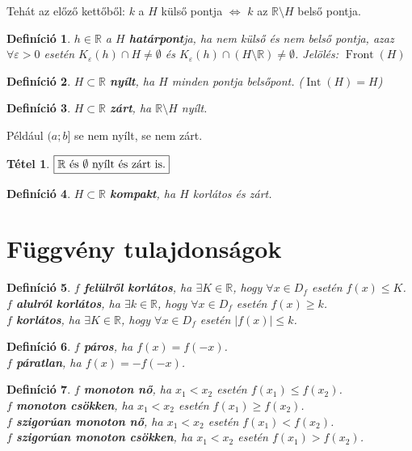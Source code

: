 \documentclass[a4paper,12pt,twoside]{book}
\DeclareMathOperator{\Int}{Int}
\DeclareMathOperator{\Front}{Front}
\newtheorem{tetel}{Tétel}[chapter]
\newtheorem{defi}{Definíció}[chapter]
\theoremstyle{break}
\newtheorem{defiNL}[defi]{Definíció}
\theoremstyle{plain}
\begin{document}
Tehát az előző kettőből: $k$ a $H$ külső pontja $\Leftrightarrow$ $k$ az $\mathbb{R}\setminus H$ belső pontja.

\begin{defi}
 $h\in \mathbb{R}$ a $H$ \textbf{határpont}ja, ha nem külső és nem belső pontja, azaz $\forall \varepsilon >0$ esetén $K_{\varepsilon}(h)\cap H\neq \emptyset$ és $K_{\varepsilon}(h)\cap (H\setminus \mathbb{R}) \neq \emptyset$. Jelölés: $\Front(H)$
\end{defi}

\begin{defi}
 $H\subset \mathbb{R}$ \textbf{nyílt}, ha $H$ minden pontja belsőpont. ($\Int(H)=H$)
\end{defi}

\begin{defi}
 $H\subset \mathbb{R}$ \textbf{zárt}, ha $\mathbb{R}\setminus H$ nyílt.
\end{defi}

Például $(a;b]$ se nem nyílt, se nem zárt.

\begin{tetel}
 $\boxed{\mathbb{R}$ és $\emptyset$ nyílt és zárt is.$}$
\end{tetel}
\addtocounter{biz}{1}

\begin{defi}
 $H\subset \mathbb{R}$ \textbf{kompakt}, ha $H$ korlátos és zárt.
\end{defi}

\section{Függvény tulajdonságok}

\begin{defiNL}
 $f$ \textbf{felülről korlátos}, ha $\exists K\in\mathbb{R}$, hogy $\forall x\in D_f$ esetén $f(x)\leqslant K$.\\
 $f$ \textbf{alulról korlátos}, ha $\exists k\in\mathbb{R}$, hogy $\forall x\in D_f$ esetén $f(x)\geqslant k$.\\
 $f$ \textbf{korlátos}, ha $\exists K\in\mathbb{R}$, hogy $\forall x\in D_f$ esetén $|f(x)|\leqslant k$.
\end{defiNL}

\begin{defiNL}
 $f$ \textbf{páros}, ha $f(x)=f(-x)$.\\
 $f$ \textbf{páratlan}, ha $f(x)=-f(-x)$.
\end{defiNL}

\begin{defiNL}
 $f$ \textbf{monoton nő}, ha $x_1<x_2$ esetén $f(x_1)\leqslant f(x_2)$.\\
 $f$ \textbf{monoton csökken}, ha $x_1<x_2$ esetén $f(x_1)\geqslant f(x_2)$.\\
 $f$ \textbf{szigorúan monoton nő}, ha $x_1<x_2$ esetén $f(x_1) < f(x_2)$.\\
 $f$ \textbf{szigorúan monoton csökken}, ha $x_1<x_2$ esetén $f(x_1) > f(x_2)$.
\end{defiNL}
\end{document}
